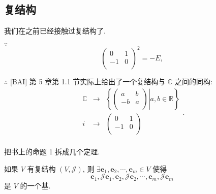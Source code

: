 \documentclass[color=black,device=normal,lang=cn,mode=geye]{elegantnote}
\begin{document}
\subsection{复结构}
我们在之前已经接触过复结构了.
\begin{example}
    $\because$
    \[\begin{pmatrix}
        0 & 1 \\
        -1 & 0 \\
    \end{pmatrix}^2=-E,\]

    $\therefore$ [BAI] 第 5 章第 1.1 节实际上给出了一个复结构与 $\mathbb{C}$ 之间的同构:
    \[\begin{array}{rcl}
        \mathbb{C} & \to & \left\{\left.\begin{pmatrix}
            a & b \\
            -b & a \\
        \end{pmatrix}\right|a,b\in\mathbb{R}\right\} \\
        i & \to & \begin{pmatrix}
            0 & 1 \\
            -1 & 0 \\
        \end{pmatrix} \\
    \end{array}.\]
\end{example}
把书上的命题 1 拆成几个定理.
\begin{theorem}\label{t4.1}
    如果 $V$ 有复结构 $(V,\mathcal{J})$, 则 $\exists\boldsymbol{e}_1,\boldsymbol{e}_2,\cdots,\boldsymbol{e}_m\in V$ 使得
    \[\boldsymbol{e}_1,\mathcal{J}\boldsymbol{e}_1,\boldsymbol{e}_2,\mathcal{J}\boldsymbol{e}_2,\cdots,\boldsymbol{e}_m,\mathcal{J}\boldsymbol{e}_m\]
    是 $V$ 的一个基.
\end{theorem}
\end{document}

